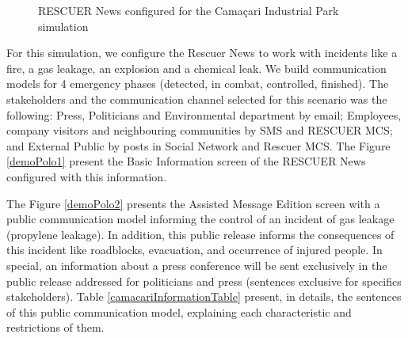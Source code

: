 \begin{figure}[h]
\centering
{}
\quad %
\caption{RESCUER News configured for the Cama\c{c}ari Industrial Park simulation}
\label{demoPolo}
\end{figure}

For this simulation, we configure the Rescuer News to work with incidents like a fire, a gas leakage, an explosion and a chemical leak. We build communication models for 4 emergency phases (detected, in combat, controlled, finished). The stakeholders and the communication channel selected for this scenario was the following: Press, Politicians and Environmental department by email; Employees, company visitors and neighbouring communities by SMS and RESCUER MCS; and External Public by posts in Social Network and Rescuer MCS. The Figure \ref{demoPolo1} present the Basic Information screen of the RESCUER News configured with this information.


The Figure \ref{demoPolo2} presents the Assisted Message Edition screen with a public communication model informing the control of an incident of gas leakage (propylene leakage). In addition, this public release informs the consequences of this incident like roadblocks, evacuation, and occurrence of injured people. In special, an information about a press conference will be sent exclusively in the public release addressed for politicians and press (sentences exclusive for specifics stakeholders). Table \ref{camacariInformationTable} present, in details, the sentences of this public communication model, explaining each characteristic and restrictions of them.


